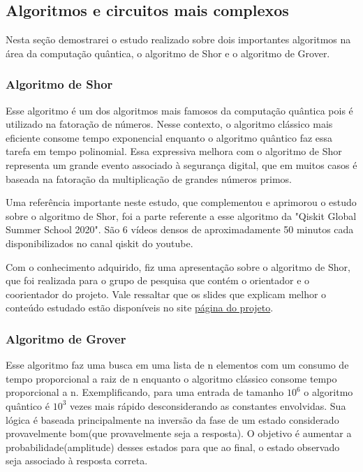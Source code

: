 \documentclass{article}
\begin{document}
    \subsection{Algoritmos e circuitos mais complexos}
        Nesta seção demostrarei o estudo realizado sobre dois importantes algoritmos na área da computação quântica, o algoritmo de Shor e o algoritmo de Grover.
        
        \subsubsection{Algoritmo de Shor}
        Esse algoritmo é um dos algoritmos mais famosos da computação quântica pois é utilizado na fatoração de números. Nesse contexto, o algoritmo clássico mais eficiente consome tempo exponencial enquanto o algoritmo quântico faz essa tarefa em tempo polinomial. Essa expressiva melhora com o algoritmo de Shor representa um grande evento associado à segurança digital, que em muitos casos é baseada na fatoração da multiplicação de grandes números primos.
        
        Uma referência importante neste estudo, que complementou e aprimorou o estudo sobre o algoritmo de Shor, foi a parte referente a esse algoritmo da "Qiskit Global Summer School 2020". São 6 vídeos densos de aproximadamente 50 minutos cada disponibilizados no canal qiskit do youtube.
        
        Com o conhecimento adquirido, fiz uma apresentação sobre o algoritmo de Shor, que foi realizada para o grupo de pesquisa que contém o orientador e o coorientador do projeto. Vale ressaltar que os slides que explicam melhor o conteúdo estudado estão disponíveis no site \href{https://interscity.org/quantum-internet/}{página do projeto}.
    
        \subsubsection{Algoritmo de Grover}
    
        Esse algoritmo faz uma busca em uma lista de n elementos com um consumo de tempo proporcional a raiz de n enquanto o algoritmo clássico consome tempo proporcional a n. Exemplificando, para uma entrada de tamanho $10^{6}$ o algoritmo quântico é $10^{3}$ vezes mais rápido desconsiderando as constantes envolvidas. Sua lógica é baseada principalmente na inversão da fase de um estado considerado provavelmente bom(que provavelmente seja a resposta). O objetivo é aumentar a probabilidade(amplitude) desses estados para que ao final, o estado observado seja associado à resposta correta.
\end{document}
